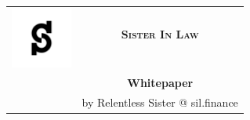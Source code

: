 \documentclass[11pt,letterpaper]{article}
\begin{document}
\sloppy     %
\begin{center}
\begin{tabular}{cc}
\multirow{2}{3.5cm}{\includegraphics[width=2cm]{img/White_icon.png}}	& \huge{\textsc{\textbf{Sister In Law}}}\\ %
 & \\ [3mm]
 & \large{\textsf{\textbf{Whitepaper}}}\\ [2mm]
 & \small{by Relentless Sister} @ sil.finance
\end{tabular}
\end{center}
\end{document}
